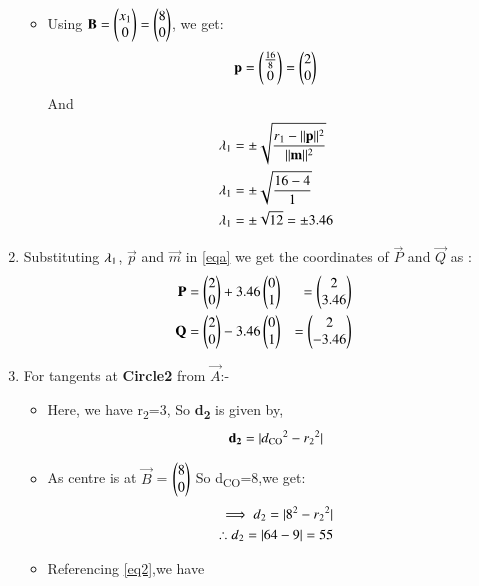 \documentclass[journal,12pt,twocolumn]{IEEEtran}
\begin{document}
\begin{enumerate}
\begin{itemize}
\begin{align}
 \end{align}
 \item Using $\mathbf{B}=\begin{pmatrix}x\textsubscript{1}\\0\end{pmatrix}=\begin{pmatrix}8\\0\end{pmatrix}$, we get: 
 \begin{align}
 \mathbf{p}=\begin{pmatrix}\frac{16}{8}\\0\end{pmatrix}=\begin{pmatrix}2\\0\end{pmatrix}
\end{align}
And
\begin{align}
\lambda\textsubscript{1} &= \pm\sqrt{\frac{r\textsubscript{1}-\lVert\mathbf{p}\rVert^2}{\lVert\mathbf{m}\rVert^2}}
\\
\lambda\textsubscript{1} &= \pm\sqrt{\frac{16-4}{1}}
\\
\lambda\textsubscript{1} &= \pm\sqrt{12}=\pm 3.46
\end{align}
\end{itemize}
\item Substituting $\lambda\textsubscript{1}$, $\vec{p}$ and $\vec{m}$ in \eqref{eqa} we get the coordinates of $\vec{P}$ and  $\vec{Q}$ as :
\begin{align}
\mathbf{P}&=\begin{pmatrix}2\\0\end{pmatrix}+ 3.46\begin{pmatrix}0\\1\end{pmatrix}&=\begin{pmatrix}2\\3.46\end{pmatrix}
\\
\mathbf{Q}&=\begin{pmatrix}2\\0\end{pmatrix}- 3.46\begin{pmatrix}0\\1\end{pmatrix}&=\begin{pmatrix}2\\-3.46\end{pmatrix}
\end{align}
\item For tangents at \textbf{Circle2} from $\vec{A}$:-
\begin{itemize}
\item Here, we have r\textsubscript{2}=3, So \textbf{d\textsubscript{2}} is given by,
\begin{align}
 \textbf{d\textsubscript{2}} = \lvert d\textsubscript{CO}^2-r\textsubscript{2}^2\vert
 \end{align}
\item  As  centre is at $\vec{B}$ = $\begin{pmatrix}8\\0\end{pmatrix}$ So d\textsubscript{CO}=8,we get:
\begin{align}
 \implies d\textsubscript{2}=\lvert8^2-r\textsubscript{2}^2\vert 
 \\
  \therefore  d\textsubscript{2}=\lvert64-9\vert = 55\label{eqX}
\end{align}
\item Referencing \eqref{eq2},we have
\begin{align}

\end{align}
\end{itemize}
\end{enumerate}
\end{document}
